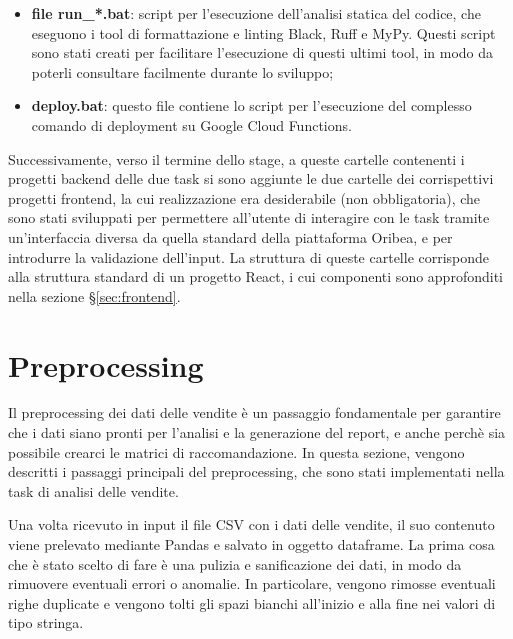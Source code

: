 \begin{itemize}
    \item \textbf{file run\_*.bat}: script per l'esecuzione dell'analisi statica del codice, che eseguono i tool di formattazione e linting Black, Ruff e MyPy. Questi script sono stati creati per facilitare l'esecuzione di questi ultimi tool, in modo da poterli consultare facilmente durante lo sviluppo;
    \item \textbf{deploy.bat}: questo file contiene lo script per l'esecuzione del complesso comando di deployment su Google Cloud Functions.
\end{itemize}

Successivamente, verso il termine dello stage, a queste cartelle contenenti i progetti backend delle due task si sono aggiunte le due cartelle dei corrispettivi progetti frontend, la cui realizzazione era desiderabile (non obbligatoria), che sono stati sviluppati per permettere all'utente di interagire con le task tramite un'interfaccia diversa da quella standard della piattaforma Oribea, e per introdurre la validazione dell'input. La struttura di queste cartelle corrisponde alla struttura standard di un progetto React, i cui componenti sono approfonditi nella sezione \S\ref{sec:frontend}.



\section{Preprocessing}
\label{sec:preprocessing}

Il preprocessing dei dati delle vendite è un passaggio fondamentale per garantire che i dati siano pronti per l'analisi e la generazione del report, e anche perchè sia possibile crearci le matrici di raccomandazione.
In questa sezione, vengono descritti i passaggi principali del preprocessing, che sono stati implementati nella task di analisi delle vendite.

Una volta ricevuto in input il file CSV con i dati delle vendite, il suo contenuto viene prelevato mediante Pandas e salvato in oggetto \gls{dataframe}. La prima cosa che è stato scelto di fare è una pulizia e sanificazione dei dati, in modo da rimuovere eventuali errori o anomalie. In particolare, vengono rimosse eventuali righe duplicate e vengono tolti gli spazi bianchi all'inizio e alla fine nei valori di tipo stringa.

